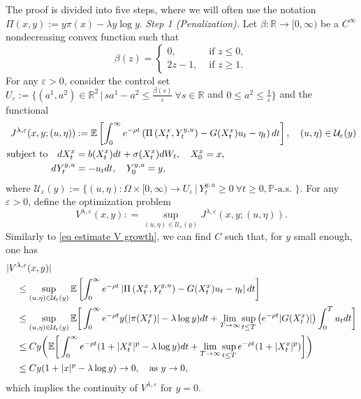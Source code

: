 \documentclass[11pt]{amsart}
\theoremstyle{plain}
\def \dd{{\rm d}}
\numberwithin{equation}{section}
\begin{document}
The proof is divided into five steps, where we will often use the notation $\Pi(x,y) := y \pi (x) -\lambda y \log y$.
\smallbreak\noindent
\emph{Step 1 (Penalization).} 
Let $\beta : \mathbb{R} \rightarrow[0, \infty)$ be a $C^{\infty}$ nondecreasing convex function such that
$$
\beta(z)= \begin{cases}0, & \text { if } z \leq 0, \\ {2z-1}, & \text { if } z \geqslant 1. \end{cases}
$$
For any $\varepsilon>0$, consider the control set $U _{\varepsilon}:= \big\{ (a^1, a^2) \in \mathbb R ^2  \, | \, sa^1 - a^2 \leq \frac{\beta(s)}{\varepsilon} \  \forall s \in \mathbb R $ and $ 0 \leq a^2 \leq \frac{1}{\varepsilon} \big\}$
and the functional
$$
\begin{aligned}
J^{\lambda, \varepsilon} (x,y;(u,\eta)) &:= \mathbb{E} \left[ \int_{0}^{\infty} e^{- \rho t}\left( \Pi\left( X^x_{t}, Y^{y,u}_{t}\right)-G(X^x_{t}) u_{t} - \eta_t \right) \dd t\right], \quad (u,\eta) \in \mathcal U _\varepsilon (y) \\ 
 \text{subject to}\quad \dd X^x_{t}&=b(X^x_{t}) \dd t+\sigma(X^x_{t}) \dd W_{t}, \quad X^x_0=x,  \\ 
\dd Y^{y,u}_t &= -u_t \dd t, \quad Y^{y,u}_0 =y, 
\end{aligned}
$$
where 
$
\text{$\mathcal U _{\varepsilon} (y):= \{ (u,\eta): \Omega \times[0, \infty) \rightarrow U _{\varepsilon}  \, | \, Y^{y,u}_{t} \geqslant 0 \ \forall t \geqslant 0, \mathbb P $-a.s. $\}$}.
$
For any $\varepsilon>0$, define the optimization problem
\begin{equation}\label{eq control problem penalized}
V^{\lambda, \varepsilon}(x, y) : = \sup _{(u,\eta) \in \mathcal U _{\varepsilon}(y)} J^{\lambda, \varepsilon}(x,y;(u,\eta)).
\end{equation}
Similarly to \eqref{eq estimate V growth}, we can find $C$ such that, for $y$ small enough, one has 
\begin{equation}
    \label{eq continuity of V lambda epsilon in 0}
    \begin{aligned}
    |V&^{\lambda, \varepsilon}(x,y)| \\
    &\leq \sup _{(u,\eta) \in \mathcal U _{\varepsilon}(y)}  \mathbb{E} \left[ \int_{0}^{\infty} e^{- \rho t}\left| \Pi\left( X^x_{t}, Y^{y,u}_{t}\right)-G(X^x_{t}) u_{t} - \eta_t \right| \dd t\right] \\
    &\leq  \sup _{(u,\eta) \in \mathcal U _{\varepsilon}(y)} \mathbb E \bigg[ \int_0^{\infty} e^{-\rho t} y(|\pi(X^x_t) |-\lambda  \log y) \dd t +  \lim_{T \to \infty}  \sup_{t \leq T} \big(e^{-\rho t}  |G(X_t^x)|\big) \int_0^T u _t \dd t  \bigg] \\
    & \leq C y \bigg( 
 \mathbb E \bigg[  \int_0^{\infty} e^{-\rho t} (1+|X^x_t|^p - \lambda \log y)   \dd t     + \lim_{T\to \infty} \sup_{t \leq T } e^{-\rho t} (1+|X^x_t|^p)  \bigg] \bigg)  \\
 & \leq C y (1 + |x|^p -\lambda \log y) \to 0, \quad\text{as $y\to 0$},
    \end{aligned}
\end{equation}
which implies the continuity of $V^{\lambda, \varepsilon}$ for $y=0$.
\end{document}
